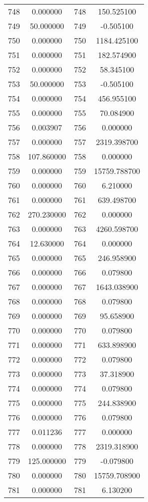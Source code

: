 \documentclass[12pt]{article}
\begin{document}
\begin{longtable}{@{}cccc@{}}
748 & 0.000000 & 748 & 150.525100 \\
749 & 50.000000 & 749 & -0.505100 \\
750 & 0.000000 & 750 & 1184.425100 \\
751 & 0.000000 & 751 & 182.574900 \\
752 & 0.000000 & 752 & 58.345100 \\
753 & 50.000000 & 753 & -0.505100 \\
754 & 0.000000 & 754 & 456.955100 \\
755 & 0.000000 & 755 & 70.084900 \\
756 & 0.003907 & 756 & 0.000000 \\
757 & 0.000000 & 757 & 2319.398700 \\
758 & 107.860000 & 758 & 0.000000 \\
759 & 0.000000 & 759 & 15759.788700 \\
760 & 0.000000 & 760 & 6.210000 \\
761 & 0.000000 & 761 & 639.498700 \\
762 & 270.230000 & 762 & 0.000000 \\
763 & 0.000000 & 763 & 4260.598700 \\
764 & 12.630000 & 764 & 0.000000 \\
765 & 0.000000 & 765 & 246.958900 \\
766 & 0.000000 & 766 & 0.079800 \\
767 & 0.000000 & 767 & 1643.038900 \\
768 & 0.000000 & 768 & 0.079800 \\
769 & 0.000000 & 769 & 95.658900 \\
770 & 0.000000 & 770 & 0.079800 \\
771 & 0.000000 & 771 & 633.898900 \\
772 & 0.000000 & 772 & 0.079800 \\
773 & 0.000000 & 773 & 37.318900 \\
774 & 0.000000 & 774 & 0.079800 \\
775 & 0.000000 & 775 & 244.838900 \\
776 & 0.000000 & 776 & 0.079800 \\
777 & 0.011236 & 777 & 0.000000 \\
778 & 0.000000 & 778 & 2319.318900 \\
779 & 125.000000 & 779 & -0.079800 \\
780 & 0.000000 & 780 & 15759.708900 \\
781 & 0.000000 & 781 & 6.130200 \\

\end{longtable}
\end{document}
